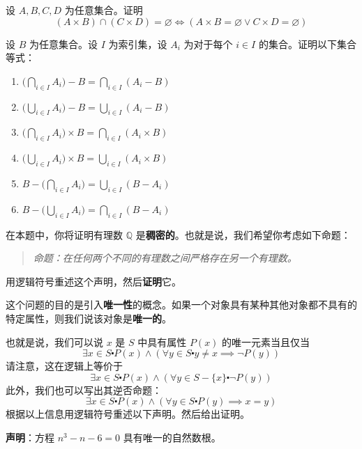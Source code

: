 \begin{exercise}
    设 $A, B, C, D$ 为任意集合。证明
    \[(A \times B) \cap (C \times D) = \varnothing \iff (A \times B = \varnothing \lor C \times D = \varnothing) \]
\end{exercise}

\begin{exercise}
    设 $B$ 为任意集合。设 $I$ 为索引集，设 $A_i$ 为对于每个 $i \in I$ 的集合。证明以下集合等式：

    \begin{enumerate}[label=(\alph*)]
        \item $\displaystyle \Bigg(\bigcap_{i \in I} A_i \Bigg) - B = \bigcap_{i \in I} (A_i - B)$
        \item $\displaystyle \Bigg(\bigcup_{i \in I} A_i \Bigg) - B = \bigcup_{i \in I} (A_i - B)$
        \item $\displaystyle \Bigg(\bigcap_{i \in I} A_i \Bigg) \times B = \bigcap_{i \in I} (A_i \times B)$
        \item $\displaystyle \Bigg(\bigcup_{i \in I} A_i \Bigg) \times B = \bigcup_{i \in I} (A_i \times B)$
        \item $\displaystyle B - \Bigg(\bigcap_{i \in I} A_i \Bigg) = \bigcup_{i \in I} (B - A_i)$
        \item $\displaystyle B - \Bigg(\bigcup_{i \in I} A_i \Bigg) = \bigcap_{i \in I} (B - A_i)$
    \end{enumerate}  
\end{exercise}

\begin{exercise}
    在本题中，你将证明有理数 $\mathbb{Q}$ 是\textbf{稠密的}。也就是说，我们希望你考虑如下命题：

    \begin{quote}
        \emph{命题：在任何两个不同的有理数之间严格存在另一个有理数。}
    \end{quote}
    用逻辑符号重述这个声明，然后\textbf{证明}它。
\end{exercise}

\begin{exercise}
    这个问题的目的是引入\textbf{唯一性}的概念。如果一个对象具有某种其他对象都不具有的特定属性，则我们说该对象是\textbf{唯一的}。

    也就是说，我们可以说 $x$ 是 $S$ 中具有属性 $P(x)$ 的唯一元素当且仅当
    \[\exists x \in S \centerdot P(x) \land (\forall y \in S \centerdot y \ne x \implies \neg P(y))\]
    请注意，这在逻辑上等价于
    \[\exists x \in S \centerdot P(x) \land (\forall y \in S - \{x\} \centerdot \neg P(y))\]
    此外，我们也可以写出其逆否命题：
    \[\exists x \in S \centerdot P(x) \land (\forall y \in S \centerdot P(y) \implies x = y)\]
    根据以上信息用逻辑符号重述以下声明。然后给出证明。

    \textbf{声明}：方程 $n^3 - n - 6 = 0$ 具有唯一的自然数根。
\end{exercise}

